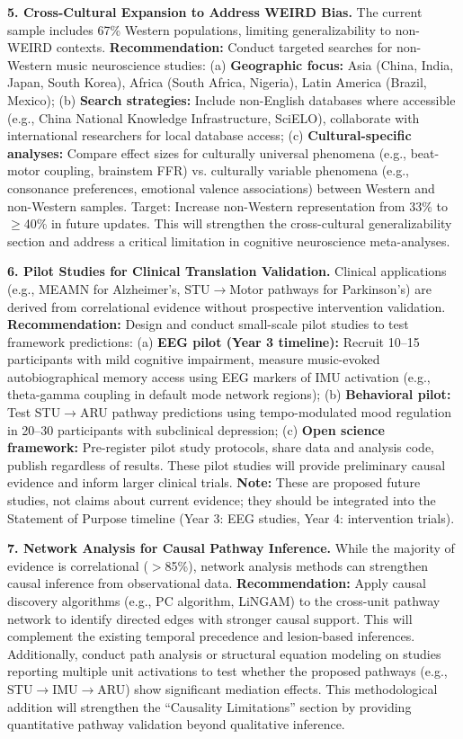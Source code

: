 \documentclass[9pt,onecolumn]{article}
\begin{document}
\textbf{5. Cross-Cultural Expansion to Address WEIRD Bias.} The current sample includes 67\% Western populations, limiting generalizability to non-WEIRD contexts. \textbf{Recommendation:} Conduct targeted searches for non-Western music neuroscience studies: (a) \textbf{Geographic focus:} Asia (China, India, Japan, South Korea), Africa (South Africa, Nigeria), Latin America (Brazil, Mexico); (b) \textbf{Search strategies:} Include non-English databases where accessible (e.g., China National Knowledge Infrastructure, SciELO), collaborate with international researchers for local database access; (c) \textbf{Cultural-specific analyses:} Compare effect sizes for culturally universal phenomena (e.g., beat-motor coupling, brainstem FFR) vs. culturally variable phenomena (e.g., consonance preferences, emotional valence associations) between Western and non-Western samples. Target: Increase non-Western representation from 33\% to $\geq$40\% in future updates. This will strengthen the cross-cultural generalizability section and address a critical limitation in cognitive neuroscience meta-analyses.

\textbf{6. Pilot Studies for Clinical Translation Validation.} Clinical applications (e.g., MEAMN for Alzheimer's, STU$\rightarrow$Motor pathways for Parkinson's) are derived from correlational evidence without prospective intervention validation. \textbf{Recommendation:} Design and conduct small-scale pilot studies to test framework predictions: (a) \textbf{EEG pilot (Year 3 timeline):} Recruit 10--15 participants with mild cognitive impairment, measure music-evoked autobiographical memory access using EEG markers of IMU activation (e.g., theta-gamma coupling in default mode network regions); (b) \textbf{Behavioral pilot:} Test STU$\rightarrow$ARU pathway predictions using tempo-modulated mood regulation in 20--30 participants with subclinical depression; (c) \textbf{Open science framework:} Pre-register pilot study protocols, share data and analysis code, publish regardless of results. These pilot studies will provide preliminary causal evidence and inform larger clinical trials. \textbf{Note:} These are proposed future studies, not claims about current evidence; they should be integrated into the Statement of Purpose timeline (Year 3: EEG studies, Year 4: intervention trials).

\textbf{7. Network Analysis for Causal Pathway Inference.} While the majority of evidence is correlational ($>$85\%), network analysis methods can strengthen causal inference from observational data. \textbf{Recommendation:} Apply causal discovery algorithms (e.g., PC algorithm, LiNGAM) to the cross-unit pathway network to identify directed edges with stronger causal support. This will complement the existing temporal precedence and lesion-based inferences. Additionally, conduct path analysis or structural equation modeling on studies reporting multiple unit activations to test whether the proposed pathways (e.g., STU$\rightarrow$IMU$\rightarrow$ARU) show significant mediation effects. This methodological addition will strengthen the ``Causality Limitations'' section by providing quantitative pathway validation beyond qualitative inference.
\end{document}
